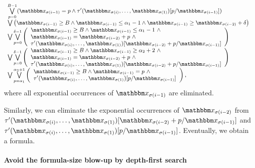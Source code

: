 \[
\small
\begin{array}{l}
\bigvee \limits_{p=0}^{B-1} ( \ivarx_{\sigma(i-1)} = p \wedge \tau'(\ivarx_{\sigma(i)}, \ldots, \ivarx_{\sigma(1)}) [p/\ivarx_{\sigma(i-1)}])   \\
\bigvee \big(\ivarx_{\sigma(i-1)} \ge B \wedge \ivarx_{\sigma(i-1)} \le \alpha_1  - 1  \wedge \ivarx_{\sigma(i-1)} \ge \ivarx_{\sigma(i-2)} +\delta \big)\\
%
\bigvee \bigvee \limits_{p=0}^{\delta-1} 
\left(
\begin{array}{l}
\ivarx_{\sigma(i-1)} \ge B \wedge \ivarx_{\sigma(i-1)} \le \alpha_1  -1 \ \wedge \\
 \ivarx_{\sigma(i-1)} = \ivarx_{\sigma(i-2)} +p\ \wedge\\
 \tau'(\ivarx_{\sigma(i)}, \ldots, \ivarx_{\sigma(1)})[\ivarx_{\sigma(i-2)} + p /\ivarx_{\sigma(i-1)}] 
\end{array}
\right)\\
\bigvee \bigvee \limits_{p=0}^{\delta-1} 
\left(
\begin{array}{l}
\ivarx_{\sigma(i-1)} \ge B \wedge \ivarx_{\sigma(i-1)} \ge \alpha_2 + 2 \ \wedge \\
 \ivarx_{\sigma(i-1)} = \ivarx_{\sigma(i-2)} +p\ \wedge\\
 \tau'(\ivarx_{\sigma(i)}, \ldots, \ivarx_{\sigma(1)})[\ivarx_{\sigma(i-2)} + p /\ivarx_{\sigma(i-1)}] 
\end{array}
\right)\\
\bigvee \bigvee \limits_{p = \alpha_1}^{\alpha_2 + 1}
\left(
\begin{array}{l}
\ivarx_{\sigma(i-1)} \ge B \wedge \ivarx_{\sigma(i-1)} = p\ \wedge \\
 \tau'(\ivarx_{\sigma(i)}, \ldots, \ivarx_{\sigma(1)})[p /\ivarx_{\sigma(i-1)}] 
\end{array}
\right),
\end{array}
\]
where all exponential occurrences of $\ivarx_{\sigma(i-1)}$ are eliminated.

Similarly, we can eliminate the exponential occurrences of $\ivarx_{\sigma(i-2)}$ from $\tau'(\ivarx_{\sigma(i)}, \ldots, \ivarx_{\sigma(1)})[\ivarx_{\sigma(i-2)} + p /\ivarx_{\sigma(i-1)}]$ and  $\tau'(\ivarx_{\sigma(i)}, \ldots, \ivarx_{\sigma(1)})[p /\ivarx_{\sigma(i-1)}]$. Eventually, we obtain a {\pa} formula.


\paragraph{Avoid the formula-size blow-up by depth-first search}

